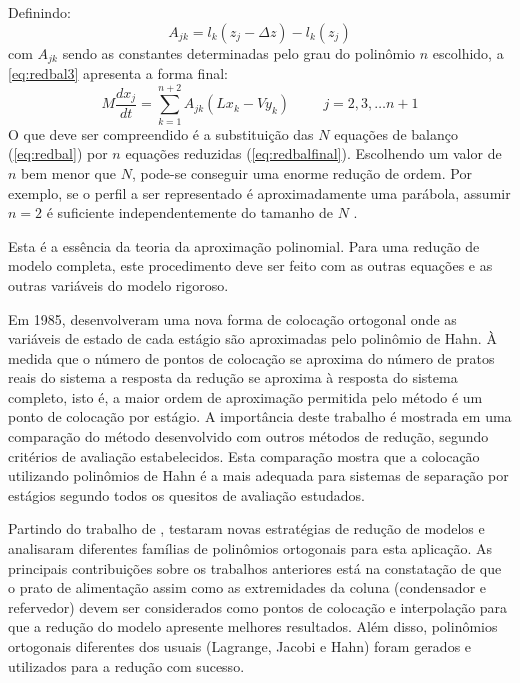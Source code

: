 Definindo:
\begin{equation}
A_{jk} = l_k(z_j-\Delta z) - l_k(z_j)
\end{equation}
com $A_{jk}$ sendo as constantes determinadas pelo grau do polinômio $n$ escolhido, a \autoref{eq:redbal3} apresenta a
forma final:
\begin{equation}
M\dfrac{dx_j}{dt}=\sum^{n+2}_{k=1} A_{jk}(Lx_k-Vy_k)  \hspace{1cm} j=2,3,\ldots n+1
\label{eq:redbalfinal}
\end{equation}
O que deve ser compreendido é a substituição das $N$ equações de balanço (\autoref{eq:redbal}) por $n$ equações
reduzidas (\autoref{eq:redbalfinal}). Escolhendo um valor de $n$ bem menor que $N$, pode-se conseguir uma enorme redução
de ordem. Por exemplo, se o perfil a ser representado é aproximadamente uma parábola, assumir $n=2$ é suficiente
independentemente do tamanho de $N$ \cite{Cho:1984}.


Esta é a essência da teoria da aproximação polinomial. Para uma redução de modelo completa, este procedimento deve
ser feito com as outras equações e as outras variáveis do modelo rigoroso.

Em 1985,  desenvolveram uma nova forma de colocação ortogonal onde as variáveis de estado de cada
estágio são aproximadas pelo polinômio de Hahn. À medida que o número de pontos de colocação se aproxima do número
de pratos reais do sistema a resposta da redução se aproxima à resposta do sistema completo, isto é, a maior
ordem de aproximação permitida pelo método é um ponto de colocação por estágio.
A importância deste trabalho é mostrada em uma comparação do método desenvolvido com outros métodos de redução, segundo
critérios de avaliação estabelecidos. Esta comparação mostra que a colocação utilizando polinômios de Hahn
é a mais adequada para sistemas de separação por estágios segundo todos os
quesitos de avaliação estudados.

Partindo do trabalho de ,  testaram novas
estratégias de redução de modelos e analisaram diferentes famílias de polinômios ortogonais
para esta aplicação. As principais contribuições sobre os trabalhos anteriores está na
constatação de que o prato de alimentação assim como as extremidades da coluna (condensador
e refervedor) devem ser considerados como pontos
de colocação e interpolação para que a redução do modelo apresente melhores resultados.
Além disso, polinômios ortogonais diferentes dos usuais (Lagrange, Jacobi e Hahn) foram gerados e utilizados para a redução com sucesso.


